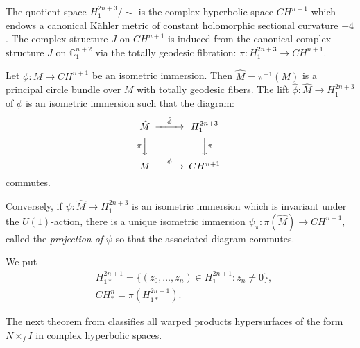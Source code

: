 \documentclass{amsart}
\theoremstyle{plain}
\numberwithin{equation}{section}
\theoremstyle{remark}
\numberwithin{equation}{section}
\begin{document}
The quotient space $H^{2n+3}_1/\sim$ is the complex hyperbolic space $CH^{n+1}$ which endows a canonical K\"ahler metric of constant holomorphic sectional curvature $-4$. The  complex structure $J$ on $ CH^{n+1}$ is induced from the canonical complex structure $J$ on $ {\mathbb C}^{n+2}_1$ via the totally geodesic fibration: $\pi:H^{2n+3}_1\rightarrow  CH^{n+1}.$

Let $\phi:M\to CH^{n+1}$ be an isometric immersion. Then $\hat M=\pi^{-1}(M)$ is a principal circle bundle over $M$ with totally geodesic fibers. The lift $\hat \phi:\hat M\to H_1^{2n+3}$ of $\phi$ is an isometric immersion such that the
 diagram:
\[\begin{CD} \hat M @>\hat \phi >>H_1^{2n+3}\\ @V{\pi}VV @VV{\pi}V\\ M @> \phi>>  CH^{n+1}\end{CD}\]
commutes.

Conversely, if $\psi:\hat M \to H_1^{2n+3}$ is an isometric immersion which is invariant under the $U(1)$-action, there
is a unique isometric immersion $\psi_\pi:\pi(\hat M)\to CH^{n+1}$,  called the {\it projection of\/} $\psi$ so that the associated diagram commutes.

We put
\begin{align} & H_{1*}^{2n+1}=\big\{(z_0,\ldots,z_{n})\in H^{2n+1}_1: z_n\ne 0\big\},\\& CH^n_*=\pi(H^{2n+1}_{1*}).\end{align}

The next theorem from  \cite{c02-3} classifies all warped products hypersurfaces of the form $N\times_{f}I$ in complex hyperbolic spaces.
\end{document}
